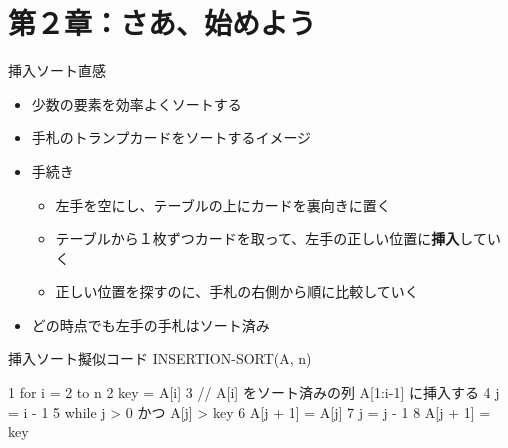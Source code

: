 \documentclass[unicode,11pt,aspectratio=169,notes]{beamer} %
\begin{document}
\section*{第２章：さあ、始めよう}

\begin{frame}
  \sectionpage
\end{frame}

\begin{frame}{挿入ソート}{直感}
  \begin{itemize}
    \item 少数の要素を効率よくソートする
    \item 手札のトランプカードをソートするイメージ
    \item 手続き
    \begin{itemize}
      \item 左手を空にし、テーブルの上にカードを裏向きに置く
      \item テーブルから１枚ずつカードを取って、左手の正しい位置に\textbf{挿入}していく
      \item 正しい位置を探すのに、手札の右側から順に比較していく
    \end{itemize}
    \item どの時点でも左手の手札はソート済み
  \end{itemize}
\end{frame}

\begin{frame}[fragile]{挿入ソート}{擬似コード}
  INSERTION-SORT(A, n)
  \begin{semiverbatim}
1  for i = 2 to n
2    key = A[i]
3    // A[i] をソート済みの列 A[1:i-1] に挿入する
4    j = i - 1
5    while j > 0 かつ A[j] > key
6      A[j + 1] = A[j]
7      j = j - 1
8    A[j + 1] = key
  \end{semiverbatim}
\end{frame}

\end{document}
